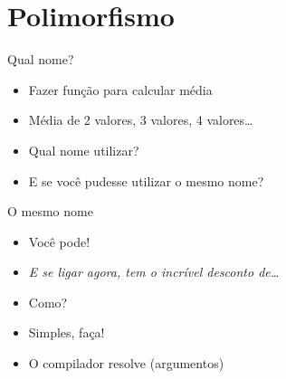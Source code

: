 \documentclass[14pt]{beamer}
\subtitle{Vire o papel}
\begin{document}
	
	\begin{frame}
		\titlepage
	\end{frame}

	\begin{frame}
		\tableofcontents
	\end{frame}

	\section{Polimorfismo}
		\begin{frame}{Qual nome?}
			\begin{itemize}
				\presentationPause\item Fazer função para calcular média
				\presentationPause\item Média de 2 valores\presentationPause, 3 valores\presentationPause, 4 valores\presentationPause\dots
				\presentationPause\item Qual nome utilizar?
				\presentationPause
				\presentationPause\item E se você pudesse utilizar o mesmo nome?
			\end{itemize}
		\end{frame}

		\begin{frame}{O mesmo nome}
			\begin{itemize}
				\presentationPause\item Você pode!
				\presentationPause\item \textit{E se ligar agora, tem o incrível desconto de\dots}
				\presentationPause\item Como?
				\presentationPause\item Simples, faça!
				\presentationPause
				\presentationPause\item O compilador resolve (argumentos)
			\end{itemize}
		\end{frame}
\end{document}
